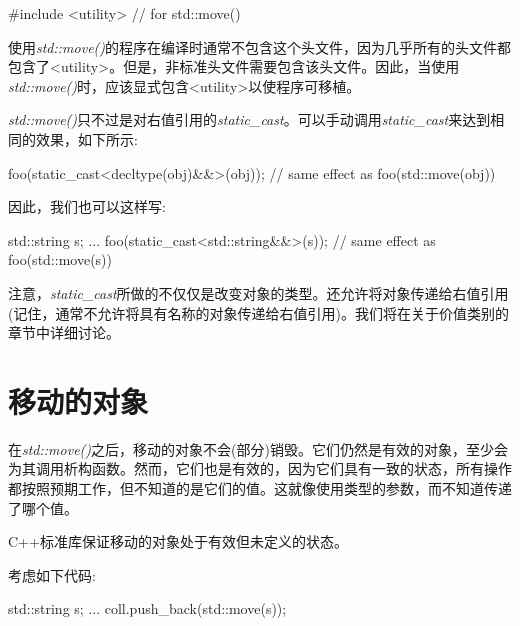 \begin{codebox}[cpp]
#include <utility> // for std::move()
\end{codebox}

使用\textit{std::move()}的程序在编译时通常不包含这个头文件，因为几乎所有的头文件都包含了<utility>。但是，非标准头文件需要包含该头文件。因此，当使用\textit{std::move()}时，应该显式包含<utility>以使程序可移植。\par


\textit{std::move()}只不过是对右值引用的\textit{static\_\allowbreak{}cast}。可以手动调用\textit{static\_\allowbreak{}cast}来达到相同的效果，如下所示:\par

\begin{codebox}[cpp]
foo(static_cast<decltype(obj)&&>(obj)); // same effect as foo(std::move(obj))
\end{codebox}

因此，我们也可以这样写:\par

\begin{codebox}[cpp]
std::string s;
...
foo(static_cast<std::string&&>(s)); // same effect as foo(std::move(s))
\end{codebox}

注意，\textit{static\_\allowbreak{}cast}所做的不仅仅是改变对象的类型。还允许将对象传递给右值引用(记住，通常不允许将具有名称的对象传递给右值引用)。我们将在关于价值类别的章节中详细讨论。\par


\section{移动的对象}

在\textit{std::move()}之后，移动的对象不会(部分)销毁。它们仍然是有效的对象，至少会为其调用析构函数。然而，它们也是有效的，因为它们具有一致的状态，所有操作都按照预期工作，但不知道的是它们的值。这就像使用类型的参数，而不知道传递了哪个值。\par


C++标准库保证移动的对象处于有效但未定义的状态。\par

考虑如下代码:\par

\begin{codebox}[cpp]
std::string s;
...
coll.push_back(std::move(s));
\end{codebox}

